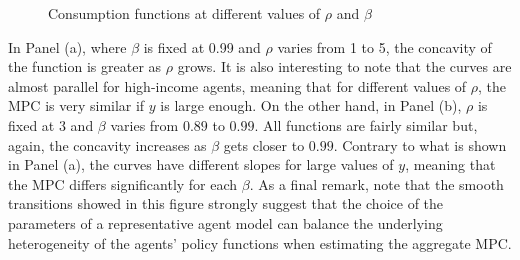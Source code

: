 \documentclass[english, a4paper, 12pt]{article}
\begin{document}
	\begin{figure}[H]
		\caption{Consumption functions at different values of $\rho$ and $\beta$} \label{fig:ConsRhoBeta}
		
		\hspace{0.02\textwidth}
		\vspace{-1ex}
	\end{figure}

In Panel (a), where $\beta$ is fixed at 0.99 and $\rho$ varies from 1 to 5, the concavity of the function is greater as $\rho$ grows. It is also interesting to note that the curves are almost parallel for high-income agents, meaning that for different values of $\rho$, the MPC is very similar if $y$ is large enough. On the other hand, in Panel (b), $\rho$ is fixed at 3 and $\beta$ varies from $0.89$ to $0.99$. All functions are fairly similar but, again, the concavity increases as $\beta$ gets closer to $0.99$. Contrary to what is shown in Panel (a), the curves have different slopes for large values of $y$, meaning that the MPC differs significantly for each $\beta$. As a final remark, note that the smooth transitions showed in this figure strongly suggest that the choice of the parameters of a representative agent model can balance the underlying heterogeneity of the agents' policy functions when estimating the aggregate MPC.
	
\end{document}
